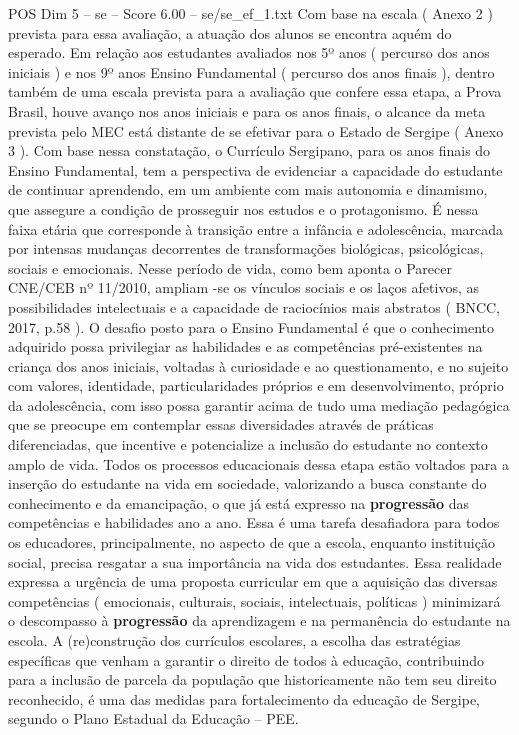 \begin{textsample}{POS Dim 5 – se – Score 6.00 – se/se\_ef\_1.txt}
Com base na escala ( Anexo 2 ) prevista para essa avaliação, a atuação dos alunos se encontra aquém do esperado.
Em relação aos estudantes avaliados nos 5º anos ( percurso dos anos iniciais ) e nos 9º anos Ensino Fundamental ( percurso dos anos finais ), dentro também de uma escala prevista para a avaliação que confere essa etapa, a Prova Brasil, houve avanço nos anos iniciais e para os anos finais, o alcance da meta prevista pelo MEC está distante de se efetivar para o Estado de Sergipe ( Anexo 3 ).
Com base nessa constatação, o Currículo Sergipano, para os anos finais do Ensino Fundamental, tem a perspectiva de evidenciar a capacidade do estudante de continuar aprendendo, em um ambiente com mais autonomia e dinamismo, que assegure a condição de prosseguir nos estudos e o protagonismo.
É nessa faixa etária que corresponde à transição entre a infância e adolescência, marcada por intensas mudanças decorrentes de transformações biológicas, psicológicas, sociais e emocionais.
Nesse período de vida, como bem aponta o Parecer CNE/CEB nº 11/2010, ampliam -se os vínculos sociais e os laços afetivos, as possibilidades intelectuais e a capacidade de raciocínios mais abstratos ( BNCC, 2017, p.58 ).
O desafio posto para o Ensino Fundamental é que o conhecimento adquirido possa privilegiar as habilidades e as competências pré-existentes na criança dos anos iniciais, voltadas à curiosidade e ao questionamento, e no sujeito com valores, identidade, particularidades próprios e em desenvolvimento, próprio da adolescência, com isso possa garantir acima de tudo uma mediação pedagógica que se preocupe em contemplar essas diversidades através de práticas diferenciadas, que incentive e potencialize a inclusão do estudante no contexto amplo de vida.
Todos os processos educacionais dessa etapa estão voltados para a inserção do estudante na vida em sociedade, valorizando a busca constante do conhecimento e da emancipação, o que já está expresso na \textbf{progressão} das competências e habilidades ano a ano.
Essa é uma tarefa desafiadora para todos os educadores, principalmente, no aspecto de que a escola, enquanto instituição social, precisa resgatar a sua importância na vida dos estudantes.
Essa realidade expressa a urgência de uma proposta curricular em que a aquisição das diversas competências ( emocionais, culturais, sociais, intelectuais, políticas ) minimizará o descompasso à \textbf{progressão} da aprendizagem e na permanência do estudante na escola.
A (re)construção dos currículos escolares, a escolha das estratégias específicas que venham a garantir o direito de todos à educação, contribuindo para a inclusão de parcela da população que historicamente não tem seu direito reconhecido, é uma das medidas para fortalecimento da educação de Sergipe, segundo o Plano Estadual da Educação – PEE.

\end{textsample}
